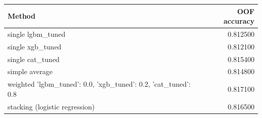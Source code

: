 \begin{tabular}{lr}
\toprule
Method & OOF accuracy \\
\midrule
single lgbm_tuned & 0.812500 \\
single xgb_tuned & 0.812100 \\
single cat_tuned & 0.815400 \\
simple average & 0.814800 \\
weighted {'lgbm_tuned': 0.0, 'xgb_tuned': 0.2, 'cat_tuned': 0.8} & 0.817100 \\
stacking (logistic regression) & 0.816500 \\
\bottomrule
\end{tabular}
